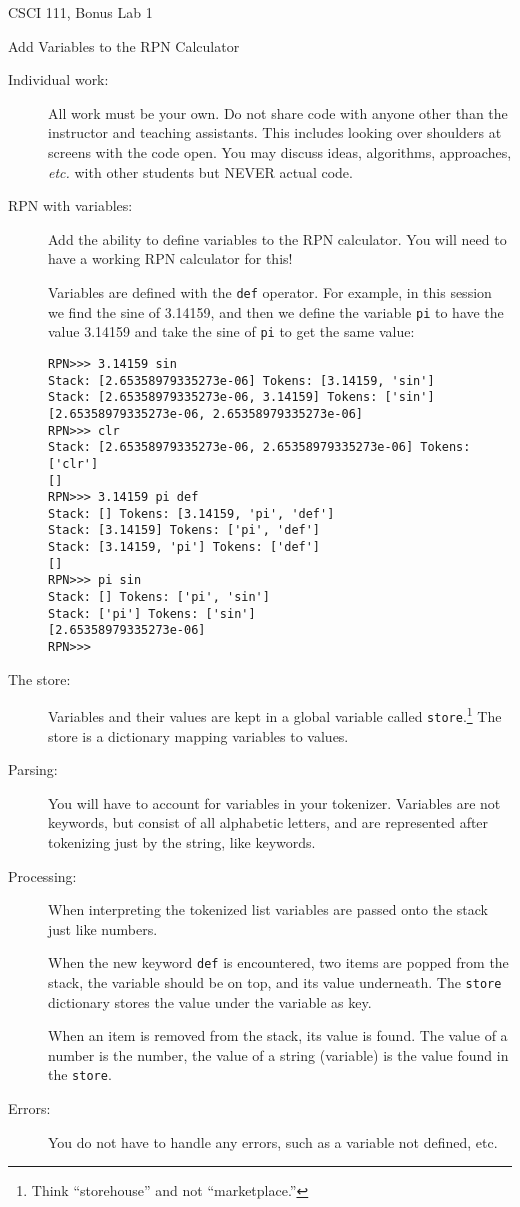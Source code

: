 \documentclass[12pt]{article}
\begin{document}
\sloppy
\centerline{\Large CSCI 111, Bonus Lab 1}
\centerline{\large Add Variables to the RPN Calculator}


\begin{description}

\item[Individual work:]  All work must be your own.  Do not share
code with anyone other than the instructor and teaching assistants.
This includes looking over shoulders at screens with the code open.
You may discuss ideas, algorithms, approaches, {\em etc.} with
other students but NEVER actual code.

\item[RPN with variables:]
Add the ability to define variables
to the RPN calculator.  You will need to have a working
RPN calculator for this!

Variables are defined with the \lstinline{def}
operator.  For example, in this session we
find the sine of 3.14159, and then we define
the variable \lstinline{pi} to have the value
3.14159 and take the sine of \lstinline{pi}
to get the same value:
\begin{lstlisting}
RPN>>> 3.14159 sin
Stack: [2.65358979335273e-06] Tokens: [3.14159, 'sin']
Stack: [2.65358979335273e-06, 3.14159] Tokens: ['sin']
[2.65358979335273e-06, 2.65358979335273e-06]
RPN>>> clr
Stack: [2.65358979335273e-06, 2.65358979335273e-06] Tokens: ['clr']
[]
RPN>>> 3.14159 pi def
Stack: [] Tokens: [3.14159, 'pi', 'def']
Stack: [3.14159] Tokens: ['pi', 'def']
Stack: [3.14159, 'pi'] Tokens: ['def']
[]
RPN>>> pi sin
Stack: [] Tokens: ['pi', 'sin']
Stack: ['pi'] Tokens: ['sin']
[2.65358979335273e-06]
RPN>>> 
\end{lstlisting}
\item[The store:]
Variables and their values are kept in a global
variable called \lstinline{store}.\footnote{Think ``storehouse''
and not ``marketplace.''}  The store is a dictionary
mapping variables to values.  

\item[Parsing:] You will have to account for
variables in your tokenizer.  Variables
are not keywords, but consist of all 
alphabetic letters, and are represented
after tokenizing just by the string, like keywords.

\item[Processing:]
When interpreting the tokenized list 
variables are passed onto the stack just like
numbers.

When the new keyword \lstinline{def} is encountered,
two items are popped from the stack, the variable
should be on top, and its value underneath.  The
\lstinline{store} dictionary stores the value
under the variable as key.

When an item is removed from the stack,
its value is found.  The value of a number
is the number, the value of a string (variable)
is the value found in the \lstinline{store}.

\item[Errors:] You do not have to handle
any errors, such as a variable not defined, etc.


\end{description}
\end{document}
